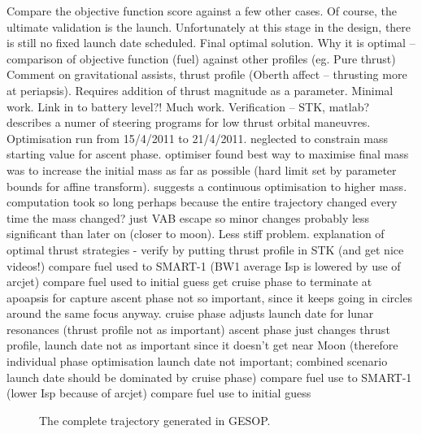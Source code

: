Compare the objective function score against a few other cases.
Of course, the ultimate validation is the launch. Unfortunately at this stage in the design, there is still no fixed launch date scheduled.
Final optimal solution.
Why it is optimal – comparison of objective function (fuel) against other profiles (eg. Pure thrust)
Comment on gravitational assists, thrust profile (Oberth affect – thrusting more at periapsis).
Requires addition of thrust magnitude as a parameter. Minimal work.
Link in to battery level?! Much work.
Verification – STK, matlab?
\textcite{Pollard2000} describes a numer of steering programs for low thrust orbital maneuvres.
Optimisation run from 15/4/2011 to 21/4/2011. neglected to constrain mass starting value for ascent phase. optimiser found best way to maximise final mass was to increase the initial mass as far as possible (hard limit set by parameter bounds for affine transform). suggests a continuous optimisation to higher mass. computation took so long perhaps because the entire trajectory changed every time the mass changed? just VAB escape so minor changes probably less significant than later on (closer to moon). Less stiff problem.
explanation of optimal thrust strategies - \textcite{Herbiniere2000}
verify by putting thrust profile in STK (and get nice videos!)
compare fuel used to SMART-1 (BW1 average Isp is lowered by use of arcjet)
compare fuel used to initial guess
get cruise phase to terminate at apoapsis for capture
ascent phase not so important, since it keeps going in circles around the same focus anyway.
cruise phase adjusts launch date for lunar resonances (thrust profile not as important)
ascent phase just changes thrust profile, launch date not as important since it doesn't get near Moon (therefore individual phase optimisation launch date not important; combined scenario launch date should be dominated by cruise phase)
compare fuel use to SMART-1 (lower Isp because of arcjet)
compare fuel use to initial guess


\begin{figure}
\centering
\def\svgwidth{\textwidth}

\caption{The complete trajectory generated in GESOP.}
\label{fig:Whole-trajectory}
\end{figure}
